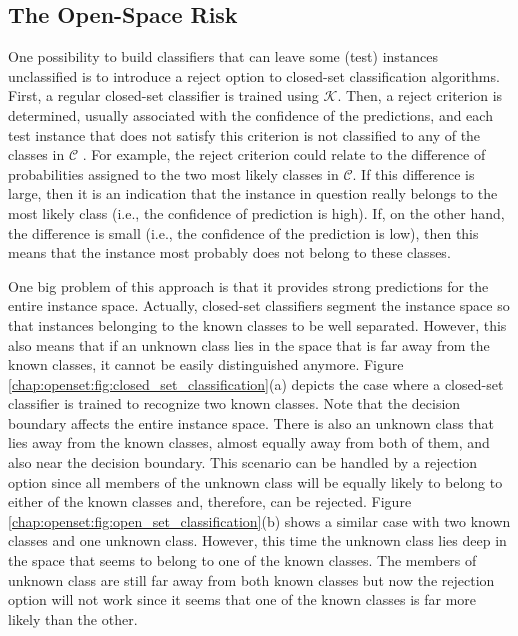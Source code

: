 \subsection{The Open-Space Risk}
\label{chap:openset:sec:open_space_risk}

One possibility to build classifiers that can leave some (test) instances unclassified is to introduce a reject option to closed-set classification algorithms. First, a regular closed-set classifier is trained using $\mathcal{K}$. Then, a reject criterion is determined, usually associated with the confidence of the predictions, and each test instance that does not satisfy this criterion is not classified to any of the classes in $\mathcal{C}$ \parencite{onan2018ensemble}. For example, the reject criterion could relate to the difference of probabilities assigned to the two most likely classes in $\mathcal{C}$. If this difference is large, then it is an indication that the instance in question really belongs to the most likely class (i.e., the confidence of prediction is high). If, on the other hand, the difference is small (i.e., the confidence of the prediction is low), then this means that the instance most probably does not belong to these classes. 

One big problem of this approach is that it provides strong predictions for the entire instance space. Actually, closed-set classifiers segment the instance space so that instances belonging to the known classes to be well separated. However, this also means that if an unknown class lies in the space that is far away from the known classes, it cannot be easily distinguished anymore. Figure \ref{chap:openset:fig:closed_set_classification}(a) depicts the case where a closed-set classifier is trained to recognize two known classes. Note that the decision boundary affects the entire instance space. There is also an unknown class that lies away from the known classes, almost equally away from both of them, and also near the decision boundary. This scenario can be handled by a rejection option since all members of the unknown class will be equally likely to belong to either of the known classes and, therefore, can be rejected. Figure \ref{chap:openset:fig:open_set_classification}(b) shows a similar case with two known classes and one unknown class. However, this time the unknown class lies deep in the space that seems to belong to one of the known classes. The members of unknown class are still far away from both known classes but now the rejection option will not work since it seems that one of the known classes is far more likely than the other. 

